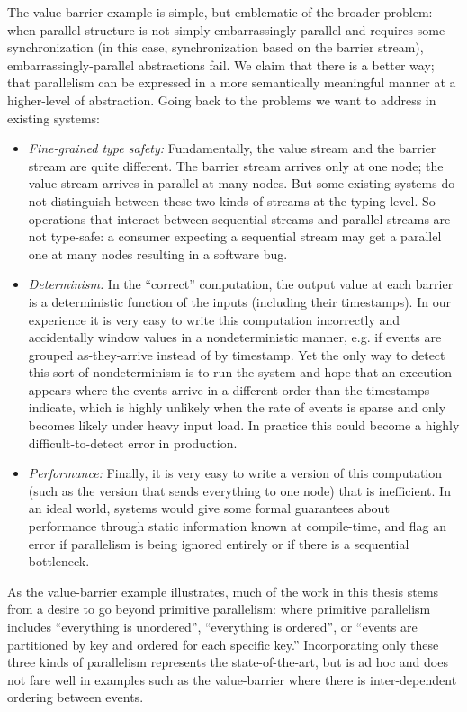 The value-barrier example is simple, but emblematic of the broader problem: when parallel structure is not simply embarrassingly-parallel and requires some synchronization (in this case, synchronization based on the barrier stream), embarrassingly-parallel abstractions fail.
We claim that there is a better way; that parallelism can be expressed in a more semantically meaningful manner at a higher-level of abstraction.
Going back to the problems we want to address in existing systems:
\begin{itemize}
  \item \emph{Fine-grained type safety:} Fundamentally, the value stream and the barrier stream are quite different. The barrier stream arrives only at one node; the value stream arrives in parallel at many nodes. But some existing systems do not distinguish between these two kinds of streams at the typing level. So operations that interact between sequential streams and parallel streams are not type-safe: a consumer expecting a sequential stream may get a parallel one at many nodes resulting in a software bug.
  \item \emph{Determinism:} In the ``correct'' computation, the output value at each barrier is a deterministic function of the inputs (including their timestamps). In our experience it is very easy to write this computation incorrectly and accidentally window values in a nondeterministic manner, e.g. if events are grouped as-they-arrive instead of by timestamp. Yet the only way to detect this sort of nondeterminism is to run the system and hope that an execution appears where the events arrive in a different order than the timestamps indicate, which is highly unlikely when the rate of events is sparse and only becomes likely under heavy input load. In practice this could become a highly difficult-to-detect error in production.
  \item \emph{Performance:} Finally, it is very easy to write a version of this computation (such as the \naive{} version that sends everything to one node) that is inefficient. In an ideal world, systems would give some formal guarantees about performance through static information known at compile-time, and flag an error if parallelism is being ignored entirely or if there is a sequential bottleneck.
\end{itemize}

As the value-barrier example illustrates, much of the work in this thesis stems from a desire to go beyond primitive parallelism: where primitive parallelism includes ``everything is unordered'', ``everything is ordered'', or ``events are partitioned by key and ordered for each specific key.'' Incorporating only these three kinds of parallelism represents the state-of-the-art, but is ad hoc and does not fare well in examples such as the value-barrier where there is inter-dependent ordering between events.

